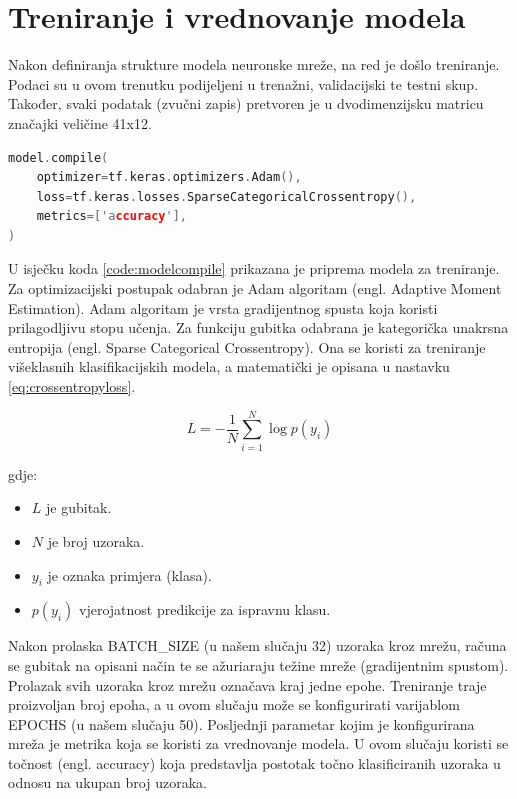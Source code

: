\section{Treniranje i vrednovanje modela}
\label{sec:training}

Nakon definiranja strukture modela neuronske mreže, na red je došlo treniranje. Podaci 
su u ovom trenutku podijeljeni u trenažni, validacijski te testni skup. Također,
svaki podatak (zvučni zapis) pretvoren je u dvodimenzijsku matricu značajki veličine 41x12.


\begin{lstlisting}[language=C++, caption=Konfiguracija za treniranje, label=code:modelcompile]
model.compile(
    optimizer=tf.keras.optimizers.Adam(),
    loss=tf.keras.losses.SparseCategoricalCrossentropy(),
    metrics=['accuracy'],
)
\end{lstlisting}

U isječku koda \ref{code:modelcompile} prikazana je priprema modela za treniranje.
Za optimizacijski postupak odabran je Adam algoritam (engl. Adaptive Moment Estimation).
Adam algoritam je vrsta gradijentnog spusta koja koristi prilagodljivu stopu učenja.
Za funkciju gubitka odabrana je kategorička unakrsna entropija (engl. Sparse Categorical
Crossentropy). Ona se koristi za treniranje višeklasnih klasifikacijskih modela, a
matematički je opisana u nastavku \ref{eq:crossentropyloss}.

\begin{equation}
    \label{eq:crossentropyloss}
    L = - \frac{1}{N} \sum_{i=1}^{N} \log p(y_i)
\end{equation}

gdje:
\begin{itemize}
    \item \( L \) je gubitak.
    \item \( N \) je broj uzoraka.
    \item \( y_i \) je oznaka primjera (klasa).
    \item \( p(y_i) \) vjerojatnost predikcije za ispravnu klasu.
\end{itemize}

Nakon prolaska BATCH\_SIZE (u našem slučaju 32) uzoraka kroz mrežu, računa se
gubitak na opisani način te se ažuriaraju težine mreže (gradijentnim spustom).
Prolazak svih uzoraka kroz mrežu označava kraj jedne epohe. Treniranje traje 
proizvoljan broj epoha, a u ovom slučaju može se konfigurirati varijablom EPOCHS
(u našem slučaju 50).
Posljednji parametar kojim je konfigurirana mreža je metrika koja se koristi za
vrednovanje modela. U ovom slučaju koristi se točnost (engl. accuracy) koja
predstavlja postotak točno klasificiranih uzoraka u odnosu na ukupan broj uzoraka.

